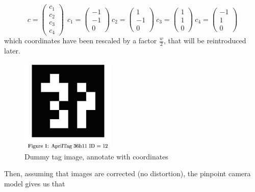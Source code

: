 \begin{equation}
    c =
    \begin{pmatrix}
    c_1 \\ c_2 \\ c_3 \\ c_4
    \end{pmatrix}
    ~~
    c_1 =  \begin{pmatrix} -1 \\ -1 \\ 0 \end{pmatrix}
    ~ 
    c_2 =  \begin{pmatrix} 1 \\ -1 \\ 0 \end{pmatrix}
    ~
    c_3 =  \begin{pmatrix} 1 \\ 1 \\ 0 \end{pmatrix}
    ~
    c_4 =  \begin{pmatrix} -1 \\ 1 \\ 0 \end{pmatrix}
\end{equation}
which coordinates have been rescaled by a factor $\frac{w}{2}$, that will be reintroduced later.

%
\begin{figure}
    \centering
    \includegraphics[width=0.4\textwidth]{figures/tag_coordinate_frame.png}
    \caption{Dummy tag image, annotate with coordinates }
    \label{fig:tag_coordinate_frame}
\end{figure}

Then, assuming that images are corrected (no distortion), the pinpoint camera model gives us that

